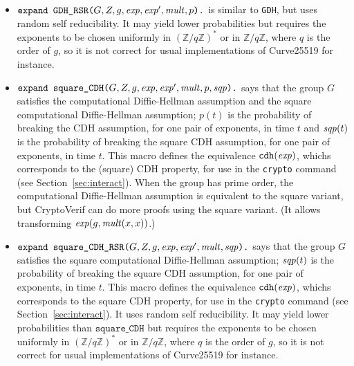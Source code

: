 \documentclass{article}
\begin{document}
\begin{itemize}
\begin{itemize}
\begin{itemize}
     \item $\texttt{expand\ GDH\_RSR(}G, Z, g, \mathit{exp}, \mathit{exp}', \mathit{mult}, p\texttt{).}$ 
       is similar to \texttt{GDH}, but uses random self reducibility. It may yield lower probabilities but requires the exponents 
       to be chosen uniformly in $(\mathbb{Z}/q\mathbb{Z})^*$ or in $\mathbb{Z}/q\mathbb{Z}$, where $q$ is the order of $g$, 
       so it is not correct for usual implementations of Curve25519 for instance.

     \item
       $\texttt{expand\ square\_CDH(}G, Z, g, \mathit{exp}, \mathit{exp}',
       \mathit{mult}, p, \mathit{sqp}\texttt{).}$
       says that the group $G$ satisfies the computational
       Diffie-Hellman assumption and the square computational
       Diffie-Hellman assumption; $p(t)$ is the probability of
       breaking the CDH assumption, for one pair of exponents, in time
       $t$ and $\mathit{sqp}(t)$ is the probability of breaking the square
       CDH assumption, for one pair of exponents, in time $t$.  This
       macro defines the equivalence $\texttt{cdh}(\mathit{exp})$, whichs
       corresponds to the (square) CDH property, for use in the
       \texttt{crypto} command (see Section~\ref{sec:interact}). When
       the group has prime order, the computational Diffie-Hellman
       assumption is equivalent to the square variant, but CryptoVerif
       can do more proofs using the square variant. (It allows
       transforming $\mathit{exp}(g, \mathit{mult}(x,x))$.)

     \item
       $\texttt{expand\ square\_CDH\_RSR(}G, Z, g, \mathit{exp},
       \mathit{exp}', \mathit{mult}, \mathit{sqp}\texttt{).}$
       says that the group $G$ satisfies the square computational
       Diffie-Hellman assumption; $\mathit{sqp}(t)$ is the probability of
       breaking the square CDH assumption, for one pair of exponents,
       in time $t$.  This macro defines the equivalence
       $\texttt{cdh}(\mathit{exp})$, whichs corresponds to the square CDH
       property, for use in the \texttt{crypto} command (see
       Section~\ref{sec:interact}). It uses random self
       reducibility. It may yield lower probabilities than
       $\texttt{square\_CDH}$ but requires the exponents to be chosen
       uniformly in $(\mathbb{Z}/q\mathbb{Z})^*$ or in $\mathbb{Z}/q\mathbb{Z}$, where $q$ is the order
       of $g$, so it is not correct for usual implementations of Curve25519 for instance.


\end{itemize}
\end{itemize}
\end{itemize}
\end{document}
